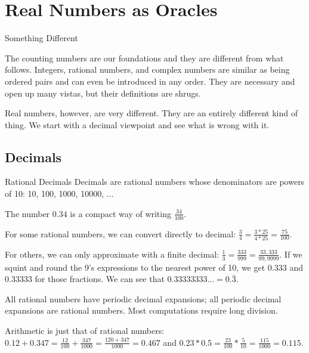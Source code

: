 \documentclass{beamer}
\begin{document}
\section{Real Numbers as Oracles}

\begin{frame}{Something Different}

The counting numbers are our foundations and they are different from what follows. Integers, rational numbers, and complex numbers are similar as being ordered pairs and can even be introduced in any order. They are necessary and open up many vistas, but their definitions are shrugs. 

Real numbers, however, are very different. They are an entirely different kind of thing. We start with a decimal viewpoint and see what is wrong with it. 

\end{frame}

\subsection{Decimals}

\begin{frame}{Rational Decimals}
    Decimals are rational numbers whose denominators are powers of 10: 10, 100, 1000, 10000, ...

    The number $0.34$ is a compact way of writing $\frac{34}{100}$. 

    For some rational numbers, we can convert directly to decimal:  $\frac{3}{4} = \frac{3*25}{4*25} = \frac{75}{100}$.

    For others, we can only approximate with a finite decimal: $\frac{1}{3} =  \frac{333}{999} = \frac{33,333}{99,9999}$. If we squint and round the 9's expressions to the nearest power of 10, we get $0.333$ and $0.33 333$ for those fractions. We can see that $0.33333333\ldots = 0.\bar{3}$.

    All rational numbers have periodic decimal expansions; all periodic decimal expansions are rational numbers. Most computations require long division. 

    Arithmetic is just that of rational numbers:  $0.12+0.347= \frac{12}{100}+\frac{347}{1000} = \frac{120+347}{1000} = 0.467  $  and $0.23*0.5 = \frac{23}{100}*\frac{5}{10} = \frac{115}{1000} = 0.115$.
    
\end{frame}
\end{document}
